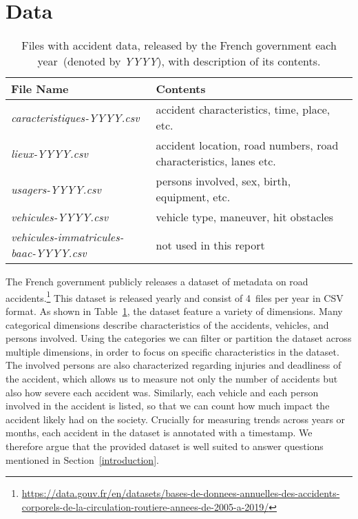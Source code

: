 \section{Data}
\label{data}
\begin{table}
    \caption{Files with accident data, released by the French government each year~(denoted by \textit{YYYY}), with description of its contents.}
    \label{table-files}
    \begin{tabularx}{\linewidth}{lX}
        \toprule
        \textbf{File Name} & \textbf{Contents} \\
        \midrule
        \textit{caracteristiques-YYYY.csv} & accident characteristics, time, place, etc. \\
        \textit{lieux-YYYY.csv} & accident location, road numbers, road characteristics, lanes etc. \\
        \textit{usagers-YYYY.csv} & persons involved, sex, birth, equipment, etc. \\
        \textit{vehicules-YYYY.csv} & vehicle type, maneuver, hit obstacles \\
        \textit{vehicules-immatricules-baac-YYYY.csv} & not used in this report \\
        \bottomrule
    \end{tabularx}
\end{table}
The French government publicly releases a dataset of  metadata on road accidents.\footnote{\url{https://data.gouv.fr/en/datasets/bases-de-donnees-annuelles-des-accidents-corporels-de-la-circulation-routiere-annees-de-2005-a-2019/}}
This dataset is released yearly and consist of 4~files per year in CSV format. As shown in  Table~\ref{table-files}, the dataset feature a variety of dimensions. Many categorical dimensions describe characteristics of the accidents, vehicles, and persons involved.
Using the categories we can filter or partition the dataset across multiple dimensions, in order to focus on specific characteristics in the dataset.
The involved persons are also characterized regarding injuries and deadliness of the accident, which allows us to measure not only the number of accidents but also how severe each accident was. Similarly, each vehicle and each person involved in the accident is listed, so that we can count how much impact the accident likely had on the society. Crucially for measuring trends across years or months, each accident in the dataset is annotated with a timestamp. We therefore argue that the provided dataset is well suited to answer questions mentioned in Section~\ref{introduction}.


